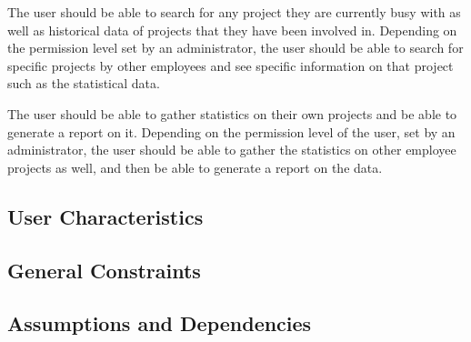 		The user should be able to search for any project they are currently busy with as well as historical data of projects that they have been involved in. Depending on the permission level set by an administrator, the user should be able to search for specific projects by other employees and see specific information on that project such as the statistical data.
		
		The user should be able to gather statistics on their own projects and be able to generate a report on it. Depending on the permission level of the user, set by an administrator, the user should be able to gather the statistics on other employee projects as well, and then be able to generate a report on the data.
	\subsection{User Characteristics}
	\subsection{General Constraints}
	\subsection{Assumptions and Dependencies}